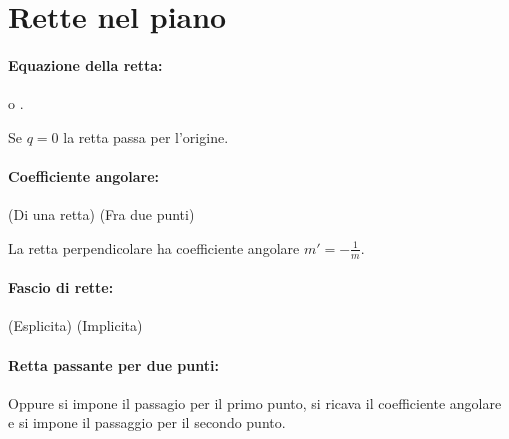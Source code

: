 \documentclass[a4paper]{article}
\begin{document}
        \section*{Rette nel piano}
                \paragraph{Equazione della retta:}
                         o .

                        Se $ q = 0 $ la retta passa per l'origine.


                \paragraph{Coefficiente angolare:}
                        (Di una retta)
                        \quad
                        (Fra due punti)

                        La retta perpendicolare ha coefficiente angolare $ m' = - \frac{1}{m} $.


                \paragraph{Fascio di rette:}
                        (Esplicita)  \qquad {} (Implicita)

                \paragraph{Retta passante per due punti:}

                        Oppure si impone il passagio per il primo punto, si ricava il coefficiente angolare e si impone il passaggio per il secondo punto.
\end{document}
